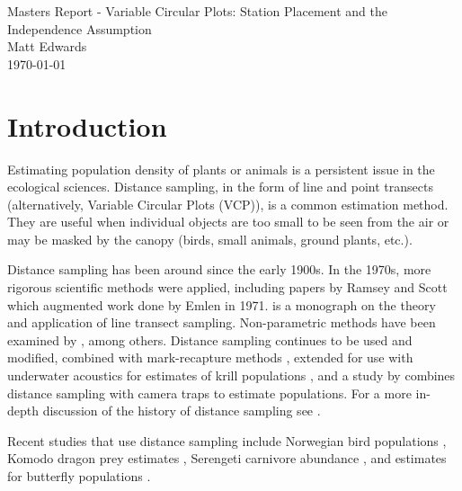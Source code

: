 \documentclass[12pt]{article}
\begin{document}
%
%
\begingroup  
  \centering
  \LARGE Masters Report - Variable Circular Plots: Station Placement and the Independence Assumption\\[1em]
  \large Matt Edwards\\
  \today\par
\endgroup

\section{Introduction}
Estimating population density of plants or animals is a persistent issue in the ecological sciences. Distance sampling, in the form of line and point transects (alternatively, Variable Circular Plots (VCP)), is a common estimation method. They are useful when individual objects are too small to be seen from the air or may be masked by the canopy (birds, small animals, ground plants, etc.).

Distance sampling has been around since the early 1900s. In the 1970s, more rigorous scientific methods were applied, including papers by Ramsey and Scott \parencite*{ramsey1979,ramsey1981} which augmented work done by Emlen in 1971. \cite{burnham1980} is a monograph on the theory and application of line transect sampling. Non-parametric methods have been examined by \textcite{quang1993,mack1998}, among others. Distance sampling continues to be used and modified, combined with mark-recapture methods \parencite{laake2011}, extended for use with underwater acoustics for estimates of krill populations \parencite{krill2011}, and a study by \textcite{camera2011} combines distance sampling with camera traps to estimate populations. For a more in-depth discussion of the history of distance sampling see \textcite{buckland2001}. 

Recent studies that use distance sampling include Norwegian bird populations \parencite{pedersen2012}, Komodo dragon prey estimates \parencite{komodo2013}, Serengeti carnivore abundance \parencite{serengeti2011}, and estimates for butterfly populations \parencite{butterfly2011}. 
\end{document}
